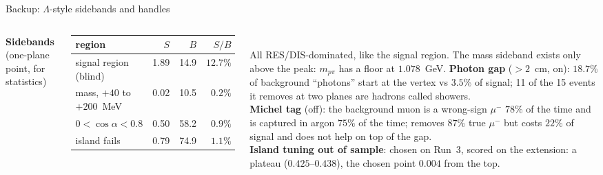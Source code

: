 \documentclass[aspectratio=169,10pt]{beamer}
\newcommand{\Lam}{\ensuremath{\Lambda}}
\begin{document}
\begin{frame}{Backup: \Lam-style sidebands and handles}
  \footnotesize
  \begin{columns}[T]
  \textbf{Sidebands} (one-plane point, for statistics)\\[2pt]
  \begin{tabular}{lrrr}
    \toprule
    region & $S$ & $B$ & $S/B$ \\
    \midrule
    signal region (blind) & 1.89 & 14.9 & $12.7\%$ \\
    mass, $+40$ to $+200$~MeV & 0.02 & 10.5 & $0.2\%$ \\
    $0<\cos\alpha<0.8$ & 0.50 & 58.2 & $0.9\%$ \\
    island fails & 0.79 & 74.9 & $1.1\%$ \\
    \bottomrule
  \end{tabular}\\[4pt]
  All RES/DIS-dominated, like the signal region. The mass sideband exists only above the
  peak: $m_{p\pi}$ has a floor at $1.078$~GeV.
  \small
  \textbf{Photon gap} ($>2$~cm, on): $18.7\%$ of background ``photons'' start at the
  vertex vs $3.5\%$ of signal; 11 of the 15 events it removes at two planes are hadrons
  called showers.\\[4pt]
  \textbf{Michel tag} (off): the background muon is a wrong-sign $\mu^-$ $78\%$ of the
  time and is captured in argon $75\%$ of the time; removes $87\%$ true $\mu^-$ but costs
  $22\%$ of signal and does not help on top of the gap.\\[4pt]
  \textbf{Island tuning out of sample}: chosen on Run~3, scored on the extension: a
  plateau ($0.425$--$0.438$), the chosen point $0.004$ from the top.
  \end{columns}
\end{frame}
\end{document}
